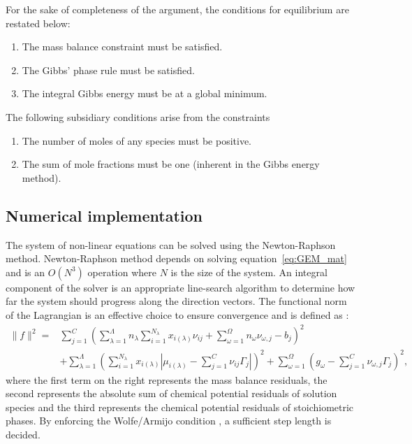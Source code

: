 	For the sake of completeness of the argument, the conditions for equilibrium are restated below:
	\begin{enumerate}
		\item The mass balance constraint must be satisfied.
		\item The Gibbs' phase rule must be satisfied.
		\item The integral Gibbs energy must be at a global minimum.
	\end{enumerate}

	The following subsidiary conditions arise from the constraints
	\begin{enumerate}[label=\Alph*.]
		\item The number of moles of any species must be positive.
		\item The sum of mole fractions must be one (inherent in the Gibbs energy method).
	\end{enumerate}
	
	\subsection{Numerical implementation}
	The system of non-linear equations can be solved using the Newton-Raphson method. Newton-Raphson method depends on solving equation~\eqref{eq:GEM_mat} and is an $\mathit{O}(N^3)$ operation where $N$ is the size of the system. 
	An integral component of the solver is an appropriate line-search algorithm to determine how far the system should progress along the direction vectors. The functional norm of the Lagrangian is an effective choice to ensure convergence and is defined as \cite{Piro17}:
	\begin{equation}
	\begin{aligned}
		\|f\|^2 = &\sum_{j=1}^{C}\left(\sum_{\lambda=1}^{\Lambda} n_\lambda \sum_{i=1}^{N_\lambda} x_{i(\lambda)}\nu_{ij} + \sum_{\omega=1}^{\Omega}n_{\omega}\nu_{\omega,j} - b_j\right)^2 \\
		&+ \sum_{\lambda=1}^{\Lambda} \left(\sum_{i=1}^{N_\lambda} x_{i(\lambda)}\left\vert\mu_{i(\lambda)} - \sum_{j=1}^{C}\nu_{ij} \Gamma_j \right\vert \right)^2 + \sum_{\omega=1}^{\Omega}\left(g_\omega - \sum_{j=1}^{C}\nu_{\omega,j} \Gamma_j \right)^2,
		\end{aligned}
	\end{equation}
	where the first term on the right represents the mass balance residuals, the second represents the absolute sum of chemical potential residuals of solution species and the third represents the chemical potential residuals of stoichiometric phases. By enforcing the Wolfe/Armijo condition \cite{Nocedal06}, a sufficient step length is decided.

